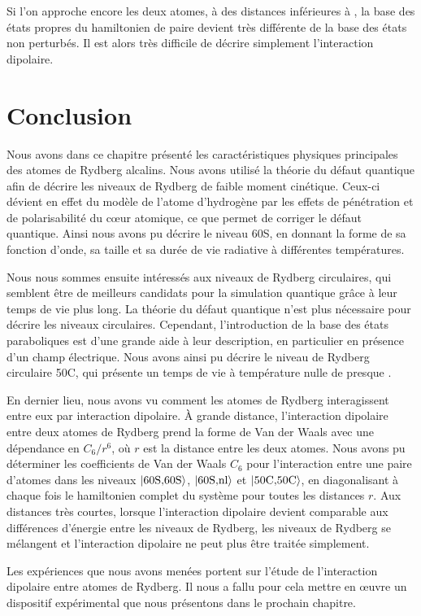 Si l'on approche encore les deux atomes, à des distances inférieures à , la base des états propres du hamiltonien de paire devient très différente de la base des états non perturbés.
Il est alors très difficile de décrire simplement l'interaction dipolaire.

\section*{Conclusion}
\noindent Nous avons dans ce chapitre présenté les caractéristiques physiques principales des atomes de Rydberg alcalins.
Nous avons utilisé la théorie du défaut quantique afin de décrire les niveaux de Rydberg de faible moment cinétique.
Ceux-ci dévient en effet du modèle de l'atome d'hydrogène par les effets de pénétration et de polarisabilité du c\oe ur atomique, ce que permet de corriger le défaut quantique.
Ainsi nous avons pu décrire le niveau 60S, en donnant la forme de sa fonction d'onde, sa taille et sa durée de vie radiative à différentes températures.

Nous nous sommes ensuite intéressés aux niveaux de Rydberg circulaires, qui semblent être de meilleurs candidats pour la simulation quantique grâce à leur temps de vie plus long.
La théorie du défaut quantique n'est plus nécessaire pour décrire les niveaux circulaires.
Cependant, l'introduction de la base des états paraboliques est d'une grande aide à leur description, en particulier en présence d'un champ électrique.
Nous avons ainsi pu décrire le niveau de Rydberg circulaire 50C, qui présente un temps de vie à température nulle de presque .

En dernier lieu, nous avons vu comment les atomes de Rydberg interagissent entre eux par interaction dipolaire.
\`A grande distance, l'interaction dipolaire entre deux atomes de Rydberg prend la forme de Van der Waals avec une dépendance en $C_6/r^6$, où $r$ est la distance entre les deux atomes.
Nous avons pu déterminer les coefficients de Van der Waals $C_6$ pour l'interaction entre une paire d'atomes dans les niveaux $\ket{\text{60S,60S}}$, $\ket{\text{60S,nl}}$ et $\ket{\text{50C,50C}}$, en diagonalisant à chaque fois le hamiltonien complet du système pour toutes les distances $r$.
Aux distances très courtes, lorsque l'interaction dipolaire devient comparable aux différences d'énergie entre les niveaux de Rydberg, les niveaux de Rydberg se mélangent et l'interaction dipolaire ne peut plus être traitée simplement.

Les expériences que nous avons menées portent sur l'étude de l'interaction dipolaire entre atomes de Rydberg.
Il nous a fallu pour cela mettre en \oe uvre un dispositif expérimental que nous présentons dans le prochain chapitre.%



